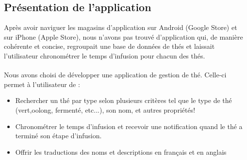 \documentclass[a4paper,12pt]{article}
\begin{document}
	\begin{spacing}{1}
	\iffalse 
	1.Expliquez le but de votre application
	- Quel problème/besoin adressez-vous? OK
	- Quelle est votre solution? OK
	- Concentrez-vous sur l'utilisateur OK
	2. Montrez les écrans et expliquer les fonctionnalités OK
	- Utilisez des images ou des vidéo OK
	3. Mentionnez les éléments extras implémentés OK
	- p.e., firebase, notifications, paramètres, sons, Google maps, OK
	- mettez cela sur les diapos même si vous n'en parlez pas en détail OK
	4. Décrivez des aspects utilisabilité OK
	- Qu'avez-vous fait pour atteindre une bonne utilisabilité? Donnez des exemples. OK
	- Est-ce que vous avez changé le design pour améliorer l'utilisabilité? OK
	5. Parlez des difficultés que vous avez eu et des bons coups
	6. Si c'était à refaire, que feriez-vous différemment?
	\fi
	\section*{Présentation de l'application}
	Après avoir naviguer les magasins d'application sur Android (Google Store) et sur iPhone (Apple Store), nous n'avons pas trouvé d'application qui, de manière cohérente et concise, regroupait une base de données de thés et laissait l'utilisateur chronométrer le temps d'infusion pour chacun des thés.\\\\
	Nous avons choisi de développer une application de gestion de thé. Celle-ci permet à l'utilisateur de : 
	\begin{itemize}
		\item Rechercher un thé par type selon plusieurs critères tel que le type de thé (vert,oolong, fermenté, etc...), son nom, et autres propriétés!
		\item Chronométrer le temps d'infusion et recevoir une notification quand le thé a terminé son étape d'infusion.
		\item Offrir les traductions des noms et descriptions en français et en anglais
	\end{itemize}
	

\end{spacing}
\end{document}
